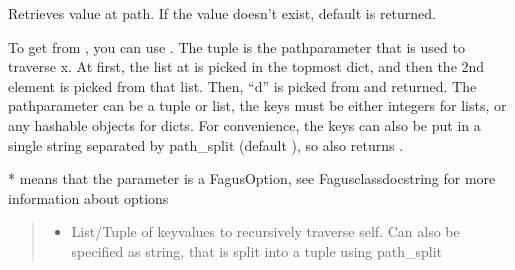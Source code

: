 \documentclass[a4paper,10pt,english]{sphinxmanual}
\begin{document}
\begin{fulllineitems}
\begin{fulllineitems}
\end{fulllineitems}


\begin{fulllineitems}
\label{\detokenize{fagus:fagus.Fagus.get}}
\pysigstartsignatures
{}
\pysigstopsignatures
\sphinxAtStartPar
Retrieves value at path. If the value doesn’t exist, default is returned.

\sphinxAtStartPar
To get  from , you can use
. The tuple  is the path\sphinxhyphen{}parameter that is used to traverse x. At first,
the list at  is picked in the top\sphinxhyphen{}most dict, and then the 2nd element  is picked from that
list. Then, “d” is picked from  and returned. The path\sphinxhyphen{}parameter can be a tuple or list, the keys
must be either integers for lists, or any hashable objects for dicts. For convenience, the keys can also be put
in a single string separated by path\_split (default ), so  also returns .

\sphinxAtStartPar
* means that the parameter is a FagusOption, see Fagus\sphinxhyphen{}class\sphinxhyphen{}docstring for more information about options
\begin{quote}\begin{description}
\begin{itemize}
\item {}
\sphinxAtStartPar
{} \textendash{} List/Tuple of key\sphinxhyphen{}values to recursively traverse self. Can also be specified as string, that is split
into a tuple using path\_split


\end{itemize}
\end{description}
\end{quote}
\end{fulllineitems}
\end{fulllineitems}
\end{document}
